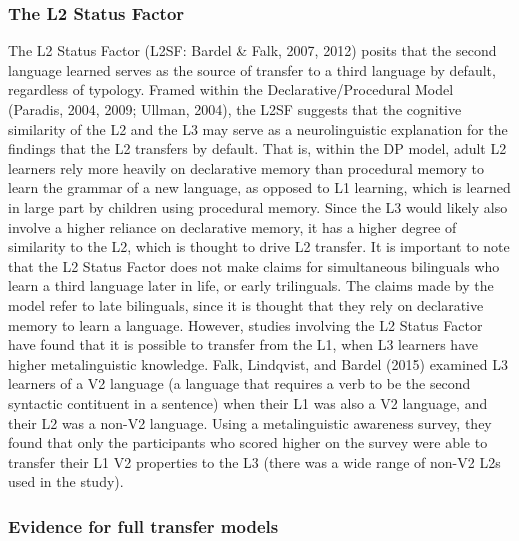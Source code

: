 \documentclass[
  english,
  man]{apa6}
\begin{document}
\hypertarget{the-l2-status-factor}{%
\subsubsection{The L2 Status Factor}\label{the-l2-status-factor}}

The L2 Status Factor (L2SF: Bardel \& Falk, 2007, 2012) posits that the second language learned serves as the source of transfer to a third language by default, regardless of typology.
Framed within the Declarative/Procedural Model (Paradis, 2004, 2009; Ullman, 2004), the L2SF suggests that the cognitive similarity of the L2 and the L3 may serve as a neurolinguistic explanation for the findings that the L2 transfers by default.
That is, within the DP model, adult L2 learners rely more heavily on declarative memory than procedural memory to learn the grammar of a new language, as opposed to L1 learning, which is learned in large part by children using procedural memory.
Since the L3 would likely also involve a higher reliance on declarative memory, it has a higher degree of similarity to the L2, which is thought to drive L2 transfer.
It is important to note that the L2 Status Factor does not make claims for simultaneous bilinguals who learn a third language later in life, or early trilinguals.
The claims made by the model refer to late bilinguals, since it is thought that they rely on declarative memory to learn a language.
However, studies involving the L2 Status Factor have found that it is possible to transfer from the L1, when L3 learners have higher metalinguistic knowledge.
Falk, Lindqvist, and Bardel (2015) examined L3 learners of a V2 language (a language that requires a verb to be the second syntactic contituent in a sentence) when their L1 was also a V2 language, and their L2 was a non-V2 language.
Using a metalinguistic awareness survey, they found that only the participants who scored higher on the survey were able to transfer their L1 V2 properties to the L3 (there was a wide range of non-V2 L2s used in the study).

\hypertarget{evidence-for-full-transfer-models}{%
\subsubsection{Evidence for full transfer models}\label{evidence-for-full-transfer-models}}
\end{document}
